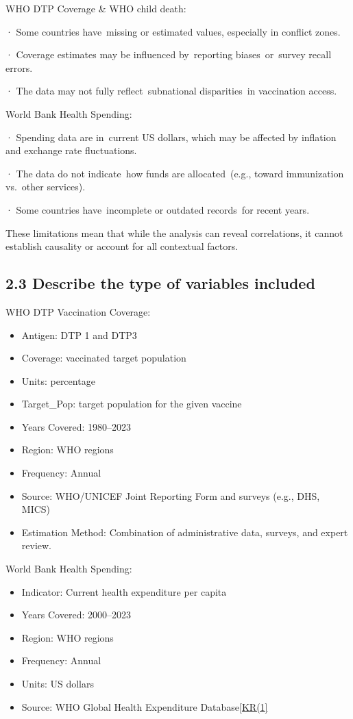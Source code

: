 \documentclass[
]{article}
\begin{document}
WHO DTP Coverage \& WHO child death:

· Some countries have~missing or estimated values, especially in
conflict zones.

· Coverage estimates may be influenced by~reporting biases~or~survey
recall errors.

· The data may not fully reflect~subnational disparities~in vaccination
access.

World Bank Health Spending:

· Spending data are in~current US dollars, which may be affected by
inflation and exchange rate fluctuations.

· The data do not indicate~how funds are allocated~(e.g., toward
immunization vs.~other services).

· Some countries have~incomplete or outdated records~for recent years.

These limitations mean that while the analysis can reveal correlations,
it cannot establish causality or account for all contextual factors.

\subsection{2.3 Describe the type of variables
included}\label{describe-the-type-of-variables-included}

WHO DTP Vaccination Coverage:

\begin{itemize}
\item
  Antigen: DTP 1 and DTP3
\item
  Coverage: vaccinated target population
\item
  Units: percentage
\item
  Target\_Pop: target population for the given vaccine
\item
  Years Covered: 1980--2023
\item
  Region: WHO regions
\item
  Frequency: Annual
\item
  Source: WHO/UNICEF Joint Reporting Form and surveys (e.g., DHS, MICS)
\item
  Estimation Method: Combination of administrative data, surveys, and
  expert review.
\end{itemize}

World Bank Health Spending:

\begin{itemize}
\item
  Indicator: Current health expenditure per capita
\item
  Years Covered: 2000--2023
\item
  Region: WHO regions
\item
  Frequency: Annual
\item
  Units: US dollars
\item
  Source: WHO Global Health Expenditure
  Database\hyperref[_msocom_1]{{[}KR(1{]}}~
\end{itemize}
\end{document}
